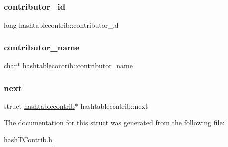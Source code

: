 \subsubsection{\texorpdfstring{contributor\+\_\+id}{contributor\_id}}
{\footnotesize\ttfamily long hashtablecontrib\+::contributor\+\_\+id}

\mbox{\label{structhashtablecontrib_a2719a86606a7ba0016f1fc9c136dd48e}} 
\subsubsection{\texorpdfstring{contributor\+\_\+name}{contributor\_name}}
{\footnotesize\ttfamily char$\ast$ hashtablecontrib\+::contributor\+\_\+name}

\mbox{\label{structhashtablecontrib_a84d60e652bf58593ee3c6eab306c216e}} 
\subsubsection{\texorpdfstring{next}{next}}
{\footnotesize\ttfamily struct \hyperlink{structhashtablecontrib}{hashtablecontrib}$\ast$ hashtablecontrib\+::next}



The documentation for this struct was generated from the following file\+:\begin{DoxyCompactItemize}
\item 
\hyperlink{hashTContrib_8h}{hash\+T\+Contrib.\+h}\end{DoxyCompactItemize}
